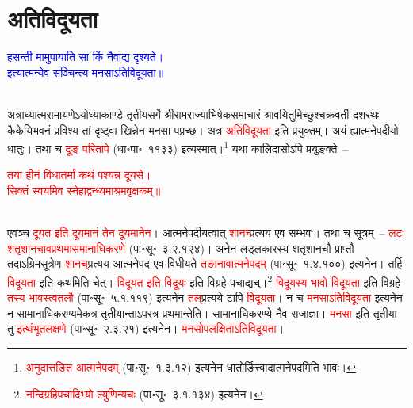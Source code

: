 \section[अतिविदूयता]{अतिविदूयता}
\centering\textcolor{blue}{हसन्ती मामुपायाति सा किं नैवाद्य दृश्यते।\nopagebreak\\
इत्यात्मन्येव सञ्चिन्त्य मनसाऽतिविदूयता॥}\nopagebreak\\
\\
\begin{sloppypar}\justifying\noindent\hspace{10mm} अत्राध्यात्म\-रामायणेऽयोध्या\-काण्डे तृतीय\-सर्गे श्रीरामराज्याभिषेक\-समाचारं श्रावयितुमिच्छुश्चक्रवर्ती दशरथः
कैकेयि\-भवनं प्रविश्य तां दृष्ट्वा खिन्नेन मनसा पप्रच्छ। अत्र \textcolor{red}{अतिविदूयता} इति प्रयुक्तम्। अयं ह्यात्मने\-पदीयो धातुः। तथा च \textcolor{red}{दूङ् परितापे} (धा॰पा॰~११३३) इत्यस्मात्।\footnote{\textcolor{red}{अनुदात्तङित आत्मने\-पदम्} (पा॰सू॰~१.३.१२) इत्यनेन धातोर्ङित्त्वादात्मने\-पदमिति भावः।} यथा कालिदासोऽपि प्रयुङ्क्ते~–\end{sloppypar}
\centering\textcolor{red}{तया हीनं विधातर्मां कथं पश्यन्न दूयसे।\nopagebreak\\
सिक्तं स्वयमिव स्नेहाद्वन्ध्यमाश्रमवृक्षकम्॥}\nopagebreak\\
\\
\begin{sloppypar}\justifying\noindent एवञ्च \textcolor{red}{दूयत इति दूयमानं तेन दूयमानेन}। आत्मनेपदीयत्वात् \textcolor{red}{शानच्}प्रत्यय एव सम्भवः। तथा च सूत्रम्~– \textcolor{red}{लटः शतृ\-शानचावप्रथमा\-समानाधिकरणे} (पा॰सू॰~३.२.१२४)। अनेन लड्लकारस्य शतृ\-शानचौ प्राप्तौ तदाऽग्रिम\-सूत्रेण \textcolor{red}{शानच्‌}\-प्रत्यय आत्मने\-पद एव विधीयते \textcolor{red}{तङानावात्मनेपदम्} (पा॰सू॰~१.४.१००) इत्यनेन। तर्हि \textcolor{red}{विदूयता} इति कथमिति चेत्।
\textcolor{red}{विदूयत इति विदूयः} इति विग्रहे पचाद्यच्।\footnote{\textcolor{red}{नन्दि\-ग्रहि\-पचादिभ्यो ल्युणिन्यचः} (पा॰सू॰~३.१.१३४) इत्यनेन।} \textcolor{red}{विदूयस्य भावो विदूयता} इति विग्रहे \textcolor{red}{तस्य भावस्त्वतलौ} (पा॰सू॰~५.१.११९) इत्यनेन \textcolor{red}{तल्‌}\-प्रत्यये टापि \textcolor{red}{विदूयता}। न च \textcolor{red}{मनसाऽति\-विदूयता} इत्यनेन न सामानाधिकरण्यमेकत्र तृतीयान्ताऽपरत्र प्रथमान्तेति। सामानाधिकरण्ये नैव राजाज्ञा। \textcolor{red}{मनसा} इति तृतीया तु \textcolor{red}{इत्थं\-भूत\-लक्षणे} (पा॰सू॰~२.३.२१) इत्यनेन। \textcolor{red}{मनसोपलक्षिताऽतिविदूयता}।\end{sloppypar}
